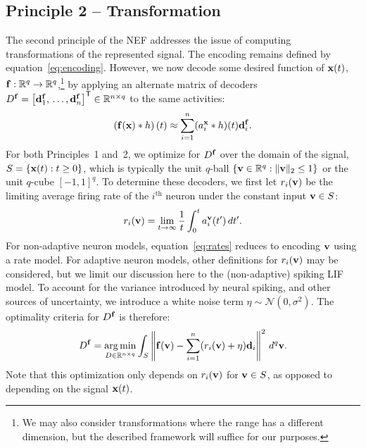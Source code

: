 \subsection{Principle 2 -- Transformation}
\label{sec:principle2}

The second principle of the NEF addresses the issue of computing transformations of the represented signal.
The encoding remains defined by equation~\ref{eq:encoding}.
However, we now decode some desired function of $\mathbf{x}(t)$, $\mathbf{f} : \mathbb{R}^q \rightarrow \mathbb{R}^q$,\footnote{
We may also consider transformations where the range has a different dimension, but the described framework will suffice for our purposes.}
by applying an alternate matrix of decoders $D^{\mathbf{f}} = {\left[ \mathbf{d}^{\mathbf{f}}_1\text{,}\, \ldots\text{,}\, \mathbf{d}^{\mathbf{f}}_n \right]}^\mathsf{T} \in \mathbb{R}^{n \times q}$ to the same activities:
\begin{equation} \label{eq:trans-decode}
\left( \mathbf{f}(\mathbf{x}) \ast h \right)(t) \approx \sum_{i=1}^n (a_i^{\mathbf{x}} \ast h)(t) \mathbf{d}^{\mathbf{f}}_i \text{.}
\end{equation}
For both Principles~1 and~2, we optimize for $D^{\mathbf{f}}$ over the domain of the signal, $S = \{\mathbf{x}(t) : t \ge 0\}$, which is typically the unit $q$-ball $\{ \mathbf{v} \in \mathbb{R}^q : \|\mathbf{v}\|_2 \le 1\}$ or the unit $q$-cube $[-1\text{,}\, 1]^q$.
To determine these decoders, we first let $r_i(\mathbf{v})$ be the limiting average firing rate of the $i^{\text{th}}$ neuron under the constant input $\mathbf{v} \in S$:
\begin{equation} \label{eq:rates}
r_i(\mathbf{v}) = \lim_{t \rightarrow \infty} \frac{1}{t} \int_{0}^t a_i^{\mathbf{v}}(t') \, dt' \text{.}
\end{equation}
For non-adaptive neuron models, equation~\ref{eq:rates} reduces to encoding $\mathbf{v}$ using a rate model.
For adaptive neuron models, other definitions for $r_i(\mathbf{v})$ may be considered, but we limit our discussion here to the (non-adaptive) spiking LIF model.
To account for the variance introduced by neural spiking, and other sources of uncertainty, we introduce a white noise term $\eta \sim \mathcal{N}(0, \sigma^2)$.
The optimality criteria for $D^{\mathbf{f}}$ is therefore:
\begin{equation} \label{eq:decoder_solution}
D^{\mathbf{f}} = \operatorname*{arg\,min}_{D \in \mathbb{R}^{n \times q}} \int_{S} \left\| \mathbf{f}(\mathbf{v}) - \sum_{i=1}^n (r_i(\mathbf{v}) + \eta) \mathbf{d}_i \right\|^2 \, d^q\mathbf{v} \text{.}
\end{equation}
Note that this optimization only depends on $r_i(\mathbf{v})$ for $\mathbf{v} \in S$, as opposed to depending on the signal $\mathbf{x}(t)$.
